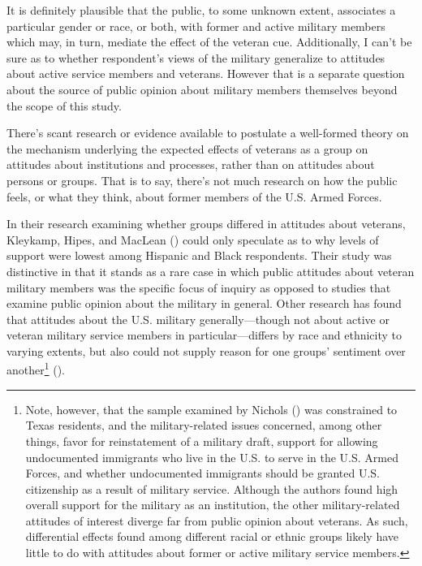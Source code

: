 \documentclass[
  12pt,
  letterpaper,
]{article}
\begin{document}
It is definitely plausible that the public, to some unknown extent,
associates a particular gender or race, or both, with former and active
military members which may, in turn, mediate the effect of the veteran
cue. Additionally, I can't be sure as to whether respondent's views of
the military generalize to attitudes about active service members and
veterans. However that is a separate question about the source of public
opinion about military members themselves beyond the scope of this
study.

There's scant research or evidence available to postulate a well-formed
theory on the mechanism underlying the expected effects of veterans as a
group on attitudes about institutions and processes, rather than on
attitudes about persons or groups. That is to say, there's not much
research on how the public feels, or what they think, about former
members of the U.S. Armed Forces.

In their research examining whether groups differed in attitudes about
veterans, Kleykamp, Hipes, and MacLean
() could only speculate as to why
levels of support were lowest among Hispanic and Black respondents.
Their study was distinctive in that it stands as a rare case in which
public attitudes about veteran military members was the specific focus
of inquiry as opposed to studies that examine public opinion about the
military in general. Other research has found that attitudes about the
U.S. military generally---though not about active or veteran military
service members in particular---differs by race and ethnicity to varying
extents, but also could not supply reason for one groups' sentiment over
another\footnote{Note, however, that the sample examined by Nichols
  () was constrained to Texas residents,
  and the military-related issues concerned, among other things, favor
  for reinstatement of a military draft, support for allowing
  undocumented immigrants who live in the U.S. to serve in the U.S.
  Armed Forces, and whether undocumented immigrants should be granted
  U.S. citizenship as a result of military service. Although the authors
  found high overall support for the military as an institution, the
  other military-related attitudes of interest diverge far from public
  opinion about veterans. As such, differential effects found among
  different racial or ethnic groups likely have little to do with
  attitudes about former or active military service members.}
().
\end{document}
